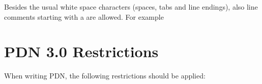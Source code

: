 \documentclass[letterpaper,10pt,english]{sphinxmanual}
\begin{document}
\sphinxAtStartPar
Besides the usual white space characters (spaces, tabs and line endings),
also line comments starting with a \sphinxcode{\sphinxupquote{\%}}  are allowed. For example

\begin{sphinxVerbatim}[commandchars=\\\{\}]
     
\PYG{p}{[} \PYG{p}{]}
  
\end{sphinxVerbatim}


\section{PDN 3.0 Restrictions}
\label{\detokenize{grammar:pdn-3-0-restrictions}}
\sphinxAtStartPar
When writing PDN, the following restrictions should be applied:
\end{document}
